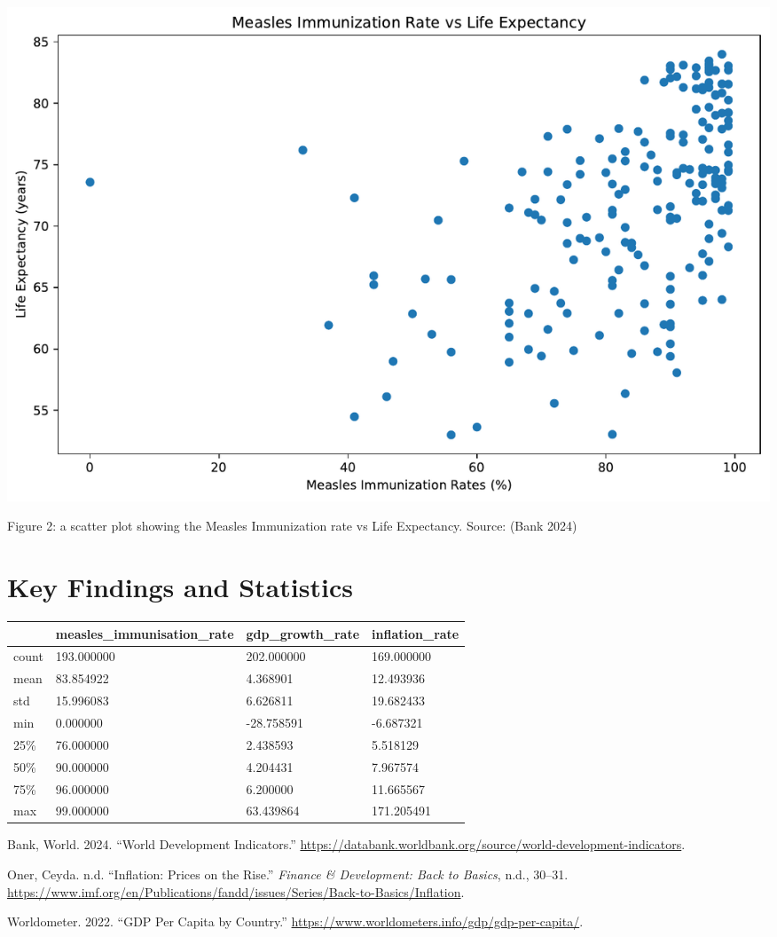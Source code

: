 \documentclass[
  letterpaper,
  DIV=11,
  numbers=noendperiod]{scrartcl}
\newlength{\cslhangindent}
\newenvironment{CSLReferences}[2] %
 {\begin{list}{}{%
  \setlength{\itemindent}{0pt}
  \setlength{\leftmargin}{0pt}
  \setlength{\parsep}{0pt}
  \ifodd #1
   \setlength{\leftmargin}{\cslhangindent}
   \setlength{\itemindent}{-1\cslhangindent}
  \fi
  \setlength{\itemsep}{#2\baselineskip}}}
 {\end{list}}
\begin{document}
\includegraphics{assignment_05_files/figure-pdf/cell-7-output-1.pdf}

Figure 2: a scatter plot showing the Measles Immunization rate vs Life
Expectancy. Source: (Bank 2024)

\section{Key Findings and Statistics}\label{key-findings-and-statistics}

\begin{longtable}[]{@{}llll@{}}
\toprule\noalign{}
& measles\_immunisation\_rate & gdp\_growth\_rate & inflation\_rate \\
\midrule\noalign{}
\endhead
\bottomrule\noalign{}
\endlastfoot
count & 193.000000 & 202.000000 & 169.000000 \\
mean & 83.854922 & 4.368901 & 12.493936 \\
std & 15.996083 & 6.626811 & 19.682433 \\
min & 0.000000 & -28.758591 & -6.687321 \\
25\% & 76.000000 & 2.438593 & 5.518129 \\
50\% & 90.000000 & 4.204431 & 7.967574 \\
75\% & 96.000000 & 6.200000 & 11.665567 \\
max & 99.000000 & 63.439864 & 171.205491 \\
\end{longtable}

\label{refs}
\begin{CSLReferences}{1}{0}
Bank, World. 2024. {``World Development Indicators.''}
\url{https://databank.worldbank.org/source/world-development-indicators}.

Oner, Ceyda. n.d. {``Inflation: Prices on the Rise.''} \emph{Finance \&
Development: Back to Basics}, n.d., 30--31.
\url{https://www.imf.org/en/Publications/fandd/issues/Series/Back-to-Basics/Inflation}.

Worldometer. 2022. {``GDP Per Capita by Country.''}
\url{https://www.worldometers.info/gdp/gdp-per-capita/}.

\end{CSLReferences}
\end{document}
